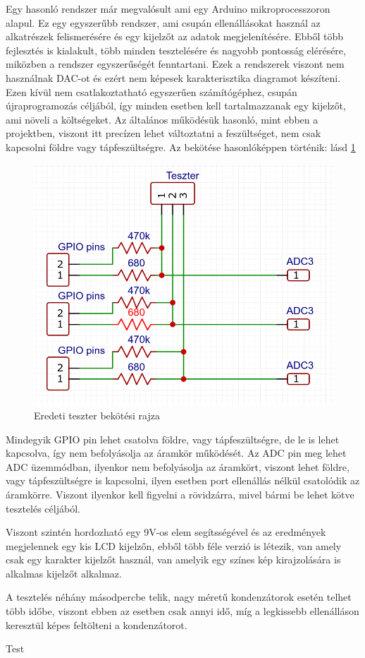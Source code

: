 Egy hasonló rendszer már megvalósult \cite{similarSystem} ami egy Arduino\cite{ArduinoAtmega} 
mikroprocesszoron alapul. Ez egy egyszerűbb rendszer, ami csupán ellenállásokat használ az 
alkatrészek felismerésére és egy kijelzőt az adatok megjelenítésére. Ebből több fejlesztés is 
kialakult, több minden tesztelésére és nagyobb pontosság elérésére, miközben a rendszer 
egyszerűségét fenntartani. Ezek a rendszerek viszont nem használnak DAC-ot és ezért nem képesek 
karakterisztika diagramot készíteni. Ezen kívül nem csatlakoztatható egyszerűen számítógéphez, 
csupán újraprogramozás céljából, így minden esetben kell tartalmazzanak egy kijelzőt, ami 
növeli a költségeket. Az általános működésük hasonló, mint ebben a projektben, viszont itt 
precízen lehet változtatni a feszültséget, nem csak kapcsolni földre vagy tápfeszültségre.
Az bekötése hasonlóképpen történik: lásd \ref{fig:basicTesterConnection}

\begin{figure}[h]
    \centering
    \includegraphics[scale=0.3]{figures/images/literature/OrgTesterConnection.png}
    \caption{Eredeti teszter bekötési rajza}
    \label{fig:basicTesterConnection}
\end{figure}

Mindegyik GPIO pin lehet csatolva földre, vagy tápfeszültségre, de le is lehet kapcsolva, így 
nem befolyásolja az áramkör működését. Az ADC pin meg lehet ADC üzemmódban, ilyenkor nem befolyásolja
az áramkört, viszont lehet földre, vagy tápfeszültségre is kapcsolni, ilyen esetben port ellenállás
nélkül csatolódik az áramkörre. Viszont ilyenkor kell figyelni a rövidzárra, mivel bármi be lehet
kötve tesztelés céljából.

Viszont szintén hordozható egy 9V-os elem segítsségével és az eredmények megjelennek egy
kis LCD kijelzőn, ebből több féle verzió is létezik, van amely csak egy karakter kijelzőt
használ, van amelyik egy színes kép kirajzolására is alkalmas kijelzőt alkalmaz. 

A tesztelés néhány másodpercbe telik, nagy méretű kondenzátorok esetén telhet több időbe,
viszont ebben az esetben csak annyi idő, míg a legkissebb ellenálláson keresztül képes feltölteni
a kondenzátorot.

Test \cite{sun2016gpio}
